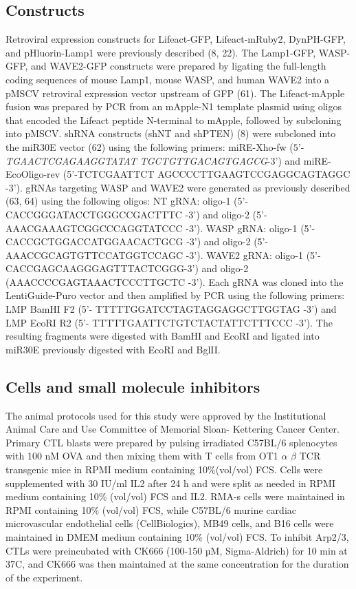 \subsection{Constructs}
Retroviral expression constructs for Lifeact-GFP, Lifeact-mRuby2, DynPH-GFP, and pHluorin-Lamp1 were previously described (8, 22). The Lamp1-GFP, WASP- GFP, and WAVE2-GFP constructs were prepared by ligating the full-length coding sequences of mouse Lamp1, mouse WASP, and human WAVE2 into a pMSCV retroviral expression vector upstream of GFP (61). The Lifeact-mApple fusion was prepared by PCR from an mApple-N1 template plasmid using oligos that encoded the Lifeact peptide N-terminal to mApple, followed by subcloning into pMSCV. shRNA constructs (shNT and shPTEN) (8) were subcloned into the miR30E vector (62) using the following primers: miRE-Xho-fw ($5’$-\emph{TGAACTCGAGAAGGTATAT TGCTGTTGACAGTGAGCG}-$3’$) and miRE-EcoOligo-rev (5’-TCTCGAATTCT AGCCCCTTGAAGTCCGAGGCAGTAGGC -3’). gRNAs targeting WASP and WAVE2 were generated as previously described (63, 64) using the following oligos: NT gRNA: oligo-1 (5’- CACCGGGATACCTGGGCCGACTTTC -3’) and oligo-2 (5’- AAACGAAAGTCGGCCCAGGTATCCC -3’). WASP gRNA: oligo-1 (5’- CACCGCTGGACCATGGAACACTGCG -3’) and oligo-2 (5’-
AAACCGCAGTGTTCCATGGTCCAGC -3’). WAVE2 gRNA: oligo-1 (5’-CACCGAGCAAGGGAGTTTACTCGGG-3’) and oligo-2 (AAACCCCGAGTAAACTCCCTTGCTC -3’). Each gRNA was cloned into the LentiGuide-Puro vector and then amplified by PCR using the following primers: LMP BamHI F2 (5’- TTTTTGGATCCTAGTAGGAGGCTTGGTAG -3’) and LMP EcoRI R2 (5’- TTTTTGAATTCTGTCTACTATTCTTTCCC -3’). The resulting fragments were digested with BamHI and EcoRI and ligated into miR30E previously digested with EcoRI and BglII.

\subsection{Cells and small molecule inhibitors}
The animal protocols used for this study were approved by the Institutional Animal Care and Use Committee of Memorial Sloan- Kettering Cancer Center. Primary CTL blasts were prepared by pulsing irradiated C57BL/6 splenocytes with 100 nM OVA and then mixing them with T cells from OT1 $\alpha$ $\beta$ TCR transgenic mice in RPMI medium containing 10\%(vol/vol) FCS. Cells were supplemented with 30 IU/ml IL2 after 24 h and were split as needed in RPMI medium containing 10\% (vol/vol) FCS and IL2. RMA-s cells were maintained in RPMI containing 10\% (vol/vol) FCS, while C57BL/6 murine cardiac microvascular endothelial cells (CellBiologics), MB49 cells, and B16 cells were maintained in DMEM medium containing 10\% (vol/vol) FCS. To inhibit Arp2/3, CTLs were preincubated with CK666 (100-150 µM, Sigma-Aldrich) for 10 min at 37\degree C, and CK666 was then maintained at the same concentration for the duration of the experiment.

